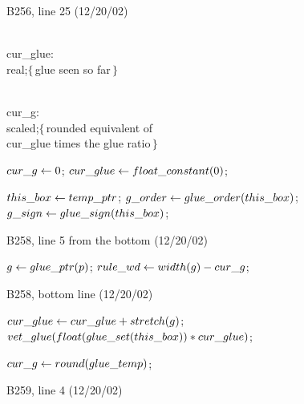 {\bugonpage B256, line 25 (12/20/02)

\ninepoint\noindent
\qquad\\{cur\_glue}: \\{real};\quad$\{\,$glue seen so far$\,\}$\par\noindent
\qquad\\{cur\_g}: \\{scaled};\quad$\{\,$rounded
  equivalent of \\{cur\_glue} times the glue ratio$\,\}$\par\noindent
{} $\\{cur\_g}\gets0$;
  $\\{cur\_glue}\gets\\{float\_constant}(0)$;\par\noindent
\quad$\\{this\_box}\gets\\{temp\_ptr}$;
 $\\{g\_order}\gets\\{glue\_order}(\\{this\_box})$;
 $\\{g\_sign}\gets\\{glue\_sign}(\\{this\_box})$;

\bugonpage B258, line 5 from the bottom (12/20/02)

\ninepoint\noindent
{} $g\gets\\{glue\_ptr}(p)$;
  $\\{rule\_wd}\gets\\{width}(g)-\\{cur\_g}$;

\bugonpage B258, bottom line (12/20/02)

\ninepoint\noindent
\qquad{} $\\{cur\_glue}\gets\\{cur\_glue}+\\{stretch}(g)$;
 $\\{vet\_glue}(\\{float}(\\{glue\_set}(\\{this\_box}))*\\{cur\_glue})$;\par
\noindent\qquad\qquad$\\{cur\_g}\gets\\{round}(\\{glue\_temp})$;

\bugonpage B259, line 4 (12/20/02)

}
